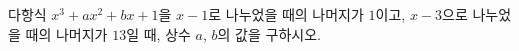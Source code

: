다항식 $x^3+ax^2+bx+1$을 $x-1$로 나누었을 때의 나머지가 $1$이고, $x-3$으로 나누었을 때의 나머지가 $13$일 때, 상수 $a$, $b$의 값을 구하시오.
